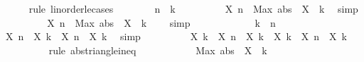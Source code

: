 \begin{isabellebody}
\ \ \ \ \isamarkupfalse%
\ {\isacharparenleft}{\kern0pt}rule\ linorder{\isacharunderscore}{\kern0pt}le{\isacharunderscore}{\kern0pt}cases{\isacharparenright}{\kern0pt}\isanewline
\ \ \ \ \ \ \isamarkupfalse%
\ {\isachardoublequoteopen}n\ {\isasymle}\ k{\isachardoublequoteclose}\isanewline
\ \ \ \ \ \ \isamarkupfalse%
\ \isamarkupfalse%
\ {\isachardoublequoteopen}{\isasymbar}X\ n{\isasymbar}\ {\isasymle}\ Max\ {\isacharparenleft}{\kern0pt}abs\ {\isacharbackquote}{\kern0pt}\ X\ {\isacharbackquote}{\kern0pt}\ {\isacharbraceleft}{\kern0pt}{\isachardot}{\kern0pt}{\isachardot}{\kern0pt}k{\isacharbraceright}{\kern0pt}{\isacharparenright}{\kern0pt}{\isachardoublequoteclose}\ \isamarkupfalse%
\ simp\isanewline
\ \ \ \ \ \ \isamarkupfalse%
\ \isamarkupfalse%
\ {\isachardoublequoteopen}{\isasymbar}X\ n{\isasymbar}\ {\isacharless}{\kern0pt}\ Max\ {\isacharparenleft}{\kern0pt}abs\ {\isacharbackquote}{\kern0pt}\ X\ {\isacharbackquote}{\kern0pt}\ {\isacharbraceleft}{\kern0pt}{\isachardot}{\kern0pt}{\isachardot}{\kern0pt}k{\isacharbraceright}{\kern0pt}{\isacharparenright}{\kern0pt}\ {\isacharplus}{\kern0pt}\ {}{\isachardoublequoteclose}\ \isamarkupfalse%
\ simp\isanewline
\ \ \ \ \isamarkupfalse%
\isanewline
\ \ \ \ \ \ \isamarkupfalse%
\ {\isachardoublequoteopen}k\ {\isasymle}\ n{\isachardoublequoteclose}\isanewline
\ \ \ \ \ \ \isamarkupfalse%
\ {\isachardoublequoteopen}{\isasymbar}X\ n{\isasymbar}\ {\isacharequal}{\kern0pt}\ {\isasymbar}X\ k\ {\isacharplus}{\kern0pt}\ {\isacharparenleft}{\kern0pt}X\ n\ {\isacharminus}{\kern0pt}\ X\ k{\isacharparenright}{\kern0pt}{\isasymbar}{\isachardoublequoteclose}\ \isamarkupfalse%
\ simp\isanewline
\ \ \ \ \ \ \isamarkupfalse%
\ \isamarkupfalse%
\ {\isachardoublequoteopen}{\isasymbar}X\ k\ {\isacharplus}{\kern0pt}\ {\isacharparenleft}{\kern0pt}X\ n\ {\isacharminus}{\kern0pt}\ X\ k{\isacharparenright}{\kern0pt}{\isasymbar}\ {\isasymle}\ {\isasymbar}X\ k{\isasymbar}\ {\isacharplus}{\kern0pt}\ {\isasymbar}X\ n\ {\isacharminus}{\kern0pt}\ X\ k{\isasymbar}{\isachardoublequoteclose}\isanewline
\ \ \ \ \ \ \ \ \isamarkupfalse%
\ {\isacharparenleft}{\kern0pt}rule\ abs{\isacharunderscore}{\kern0pt}triangle{\isacharunderscore}{\kern0pt}ineq{\isacharparenright}{\kern0pt}\isanewline
\ \ \ \ \ \ \isamarkupfalse%
\ \isamarkupfalse%
\ {\isachardoublequoteopen}{\isasymdots}\ {\isacharless}{\kern0pt}\ Max\ {\isacharparenleft}{\kern0pt}abs\ {\isacharbackquote}{\kern0pt}\ X\ {\isacharbackquote}{\kern0pt}\ {\isacharbraceleft}{\kern0pt}{\isachardot}{\kern0pt}{\isachardot}{\kern0pt}k{\isacharbraceright}{\kern0pt}{\isacharparenright}{\kern0pt}\ {\isacharplus}{\kern0pt}\ {}{\isachardoublequoteclose}\isanewline

\end{isabellebody}
